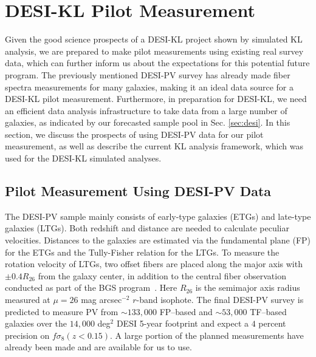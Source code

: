 \section{DESI-KL Pilot Measurement}
\label{sec:pilot}

Given the good science prospects of a DESI-KL project shown by simulated KL analysis, we are prepared to make pilot measurements using existing real survey data, which can further inform us about the expectations for this potential future program. The previously mentioned DESI-PV survey has already made fiber spectra measurements for many galaxies, making it an ideal data source for a DESI-KL pilot measurement. Furthermore, in preparation for DESI-KL, we need an efficient data analysis infrastructure to take data from a large number of galaxies, as indicated by our forecasted sample pool in Sec. \ref{sec:desi}. In this section, we discuss the prospects of using DESI-PV data for our pilot measurement, as well as describe the current KL analysis framework, which was used for the DESI-KL simulated analyses.

\subsection{Pilot Measurement Using DESI-PV Data}
\label{sec:pv}
The DESI-PV sample mainly consists of early-type galaxies (ETGs) and late-type galaxies (LTGs). Both redshift and distance are needed to calculate peculiar velocities. Distances to the galaxies are estimated via the fundamental plane (FP) for the ETGs and the Tully-Fisher relation for the LTGs. To measure the rotation velocity of LTGs, two offset fibers are placed along the major axis with $\pm 0.4R_{26}$ from the galaxy center, in addition to the central fiber observation conducted as part of the BGS program~\citep[see the Fig. 8 in][for an example measurement]{DESIPV23}. Here $R_{26}$ is the semimajor axis radius measured at $\mu=26$ mag arcsec$^{-2}$ $r$-band isophote. The final DESI-PV survey is predicted to measure PV from $\sim 133,000$ FP--based and $\sim53,000$ TF--based galaxies over the $14,000$ deg$^2$ DESI 5-year footprint and expect a $4$ percent precision on $f\sigma_8(z<0.15)$. A large portion of the planned measurements have already been made and are available for us to use.

